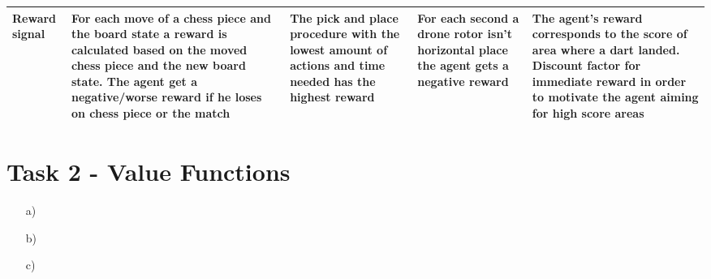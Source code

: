 \documentclass[a4paper]{article}
\begin{document}
\begin{tabularx}{\textwidth} { 
    		 >{\centering}X 
    		| >{\raggedright}X 
    		| >{\raggedright\arraybackslash}X
    		| >{\raggedright\arraybackslash}X 
    		| >{\raggedright\arraybackslash}X}
    	\hline
    	\vspace{2pt} \textbf{Reward} signal  & \vspace{2pt} For each move of a chess piece and the board state a reward is calculated based on the moved chess piece and the new board state. The agent get a negative/worse reward if he loses on chess piece or the match & \vspace{2pt} The pick and place procedure with the lowest amount of actions and time needed has the highest reward & \vspace{2pt} For each second a drone rotor isn't horizontal place the agent gets a negative reward & \vspace{2pt} The agent's reward corresponds to the score of area where a dart landed. Discount factor for immediate reward in order to motivate the agent aiming for high score areas \\
    	\hline
    \end{tabularx}
	\newpage
	\section*{Task 2 - Value Functions}
	\begin{itemize}
		\item[a)]
		\item[b)]
		\item[c)]
	\end{itemize}
\end{document}
